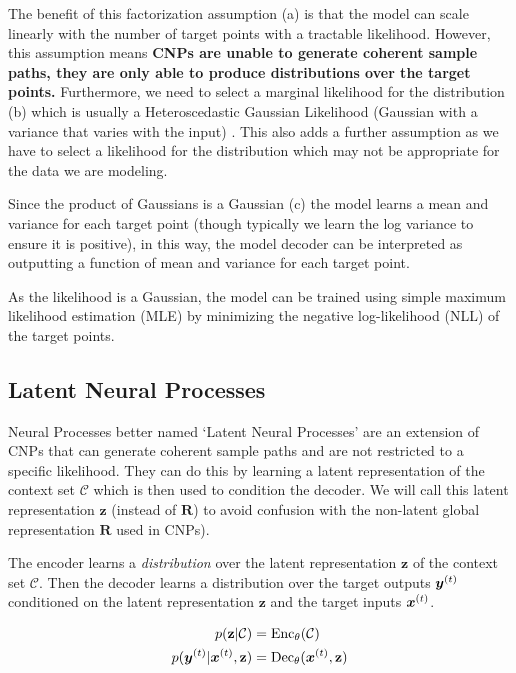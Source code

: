 \documentclass[../../main.tex]{subfiles}
\begin{document}
The benefit of this factorization assumption (a) is that the model can scale linearly with the number of target points with a tractable likelihood. However, this assumption means
\textbf{CNPs are unable to generate coherent sample paths, they are only able to produce distributions over the target points.} Furthermore, we need to select a marginal likelihood for the distribution (b) which is usually a Heteroscedastic Gaussian Likelihood (Gaussian with a variance that varies with the input) \cite{garnelo2018conditional}. This also adds a further assumption as we have to select a likelihood for the distribution which may not be appropriate for the data we are modeling.

Since the product of Gaussians is a Gaussian (c) the model learns a mean and variance for each target point (though typically we learn the log variance to ensure it is positive), in this way, the model decoder can be interpreted as outputting a function of mean and variance for each target point.

As the likelihood is a Gaussian, the model can be trained using simple maximum likelihood estimation (MLE) by minimizing the negative log-likelihood (NLL) of the target points.


\subsection{Latent Neural Processes}

Neural Processes better named `Latent Neural Processes' are an extension of CNPs that can generate coherent sample paths and are not restricted to a specific likelihood. They can do this by learning a latent representation of the context set $\mathcal{C}$ which is then used to condition the decoder. We will call this latent representation $\mathbf{z}$ (instead of $\bm{R}$) to avoid confusion with the non-latent global representation $\bm{R}$ used in CNPs).

The encoder learns a \emph{distribution} over the latent representation $\mathbf{z}$ of the context set $\mathcal{C}$. Then the decoder learns a distribution over the target outputs $\bm{y}^{(t)}$ conditioned on the latent representation $\mathbf{z}$ and the target inputs $\bm{x}^{(t)}$.

\begin{align*}
    p(\mathbf{z} | \mathcal{C}) &= \text{Enc}_\theta(\mathcal{C})\\ p(\bm{y}^{(t)} | \bm{x}^{(t)}, \mathbf{z}) &= \text{Dec}_\theta(\bm{x}^{(t)}, \mathbf{z})
\end{align*}
\end{document}
